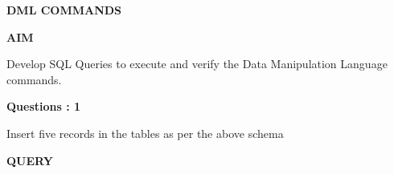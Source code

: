 \documentclass[a4paper,12pt]{report}
\begin{document}
\newpage
\begin{center}
		\large\textbf{DML COMMANDS}
	\end{center}
	
	\begin{flushleft}
		\textbf{AIM }
	\end{flushleft} 
	   Develop SQL Queries to execute and verify the Data Manipulation Language commands.
\begin{flushleft}
    \textbf{Questions : 1}
\end{flushleft}
 Insert five records in the tables as per the above schema
	
	\begin{flushleft}
		\textbf{QUERY }
	\end{flushleft}
\end{document}
